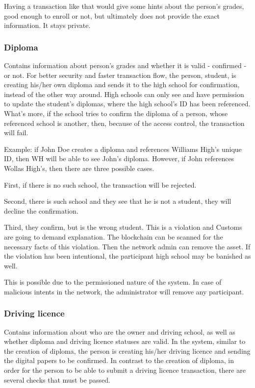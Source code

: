 \documentclass[a4paper,11pt]{report}
\begin{document}
	Having a transaction like that would give some hints about the person’s grades, good enough to enroll or not, but ultimately does not provide the exact information. It stays private. 

\subsubsection{Diploma}
Contains information about person’s grades and whether it is valid - confirmed - or not.  
	For better security and faster transaction flow, the person, student, is creating his/her own diploma and sends it to the high school for confirmation, instead of the other way around. High schools can only see and have permission to update the student’s diplomas, where the high school’s ID has been referenced. What's more, if the school tries to confirm the diploma of a person, whose referenced school is another, then, because of the access control, the transaction will fail.
	
	Example: if John Doe creates a diploma and references Williams High's unique ID, then WH will be able to see John's diploma. However, if John references Wollas High's, then there are three possible cases. 
	
	First, if there is no such school, the transaction will be rejected. 

	Second, there is such school and they see that he is not a student, they will decline the confirmation.

	Third, they confirm, but is the wrong student. This is a violation and Customs are going to demand explanation. The blockchain can be scanned for the necessary facts of this violation. Then the network admin can remove the asset. If the violation has been intentional, the participant high school may be banished as well.

	This is possible due to the permissioned nature of the system. In case of malicious intents in the network, the administrator will remove any participant. 

\subsubsection{Driving licence}
	Contains information about who are the owner and driving school, as well as whether diploma and driving licence statuses are valid.  
	In the system, similar to the creation of diploma, the person is creating his/her driving licence and sending the digital papers to be confirmed. In contrast to the creation of diploma, in order for the person to be able to submit a driving licence transaction, there are several checks that must be passed. 
	
\end{document}

